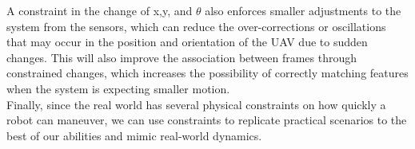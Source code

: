 A constraint in the change of x,y, and $\theta$ also enforces smaller adjustments to the system from the sensors, which can reduce the over-corrections or oscillations that may occur in the position and orientation of the UAV due to sudden changes. This will also improve the association between frames through constrained changes, which increases the possibility of correctly matching features when the system is expecting smaller motion.\\

Finally, since the real world has several physical constraints on how quickly a robot can maneuver, we can use constraints to replicate practical scenarios to the best of our abilities and mimic real-world dynamics.